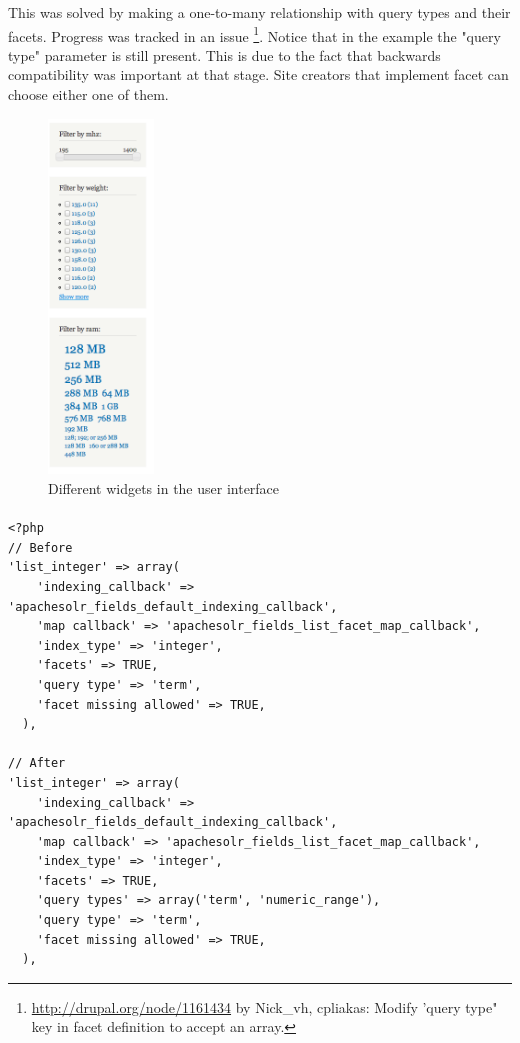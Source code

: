 This was solved by making a one-to-many relationship with query types and their facets. Progress was tracked in an issue \footnote{\url{http://drupal.org/node/1161434} by Nick\_vh, cpliakas: Modify 'query type" key in facet definition to accept an array.}. Notice that in the example the "query type" parameter is still present. This is due to the fact that backwards compatibility was important at that stage. Site creators that implement facet can choose either one of them.

\begin{figure}
\begin{center}
     \vspace{-25pt}
     \includegraphics[width=0.25\textwidth]{images/implementation/facetapi_widgets.png}
     \caption{Different widgets in the user interface}
     \vspace{-25pt}
\end{center}
\end{figure}
\paragraph{}
\begin{verbatim}
<?php
// Before
'list_integer' => array(
    'indexing_callback' => 'apachesolr_fields_default_indexing_callback',
    'map callback' => 'apachesolr_fields_list_facet_map_callback',
    'index_type' => 'integer',
    'facets' => TRUE,
    'query type' => 'term',
    'facet missing allowed' => TRUE,
  ),

// After
'list_integer' => array(
    'indexing_callback' => 'apachesolr_fields_default_indexing_callback',
    'map callback' => 'apachesolr_fields_list_facet_map_callback',
    'index_type' => 'integer',
    'facets' => TRUE,
    'query types' => array('term', 'numeric_range'),
    'query type' => 'term',
    'facet missing allowed' => TRUE,
  ),
\end{verbatim}

